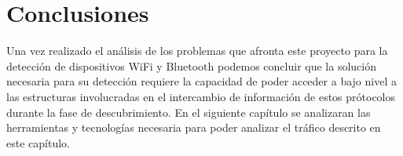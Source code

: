 \documentclass[../proyecto.tex]{subfiles}
\begin{document}
\section{Conclusiones}

Una vez realizado el análisis de los problemas que afronta este proyecto para la detección de dispositivos WiFi y Bluetooth podemos concluir que la solución necesaria para su detección requiere la capacidad de  poder acceder a bajo nivel a las estructuras involucradas en el intercambio de información de estos prótocolos durante la fase de descubrimiento. En el siguiente capítulo se analizaran las herramientas y tecnologías necesaria para poder analizar el tráfico descrito en este capítulo.\\
\end{document}
